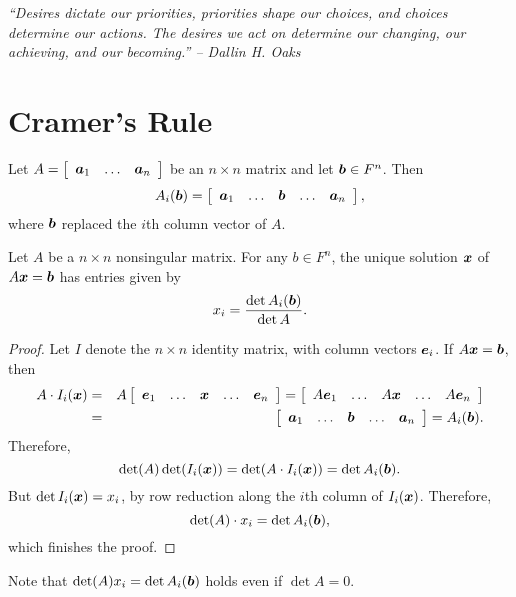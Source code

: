 \begin{center} 
\emph{``Desires dictate our priorities, priorities shape our choices, and choices determine our actions. The desires we act on determine our changing, our achieving, and our becoming.'' -- Dallin H. Oaks}
\end{center}

\section{Cramer's Rule}\label{sec:cramer}
\begin{Def} Let $A = \mtx{ccc}{\bb a_1 & \ldots & \bb a_n}$ be an $n\times n$ matrix and let $\bb b \in F^n$. Then 
\[A_i(\bb b) = \mtx{ccccc}{\bb a_1 & \ldots & \bb b & \ldots & \bb a_n},\] where $\bb b$ replaced the $i$th column vector of $A$.
\end{Def}\vs

\begin{Thm} Let $A$ be a $n\times n$ nonsingular matrix. For any $b\in F^n$, the unique solution $\bb x$ of $A\bb x = \bb b$ has entries given by 
\[x_i = \dfrac{\det A_i(\bb b)}{\det A}.\]
\end{Thm}
\begin{proof}
Let $I$ denote the $n\times n$ identity matrix, with column vectors $\bb e_i$. If $A\bb x = \bb b$, then 
\begin{eqnarray*}
A\cdot I_i(\bb x) &=& A\mtx{ccccc}{\bb e_1 & \ldots & \bb x & \ldots & \bb e_n} =  \mtx{ccccc}{A\bb e_1 & \ldots & A\bb x & \ldots & A\bb e_n}\\
&=& \mtx{ccccc}{\bb a_1 & \ldots & \bb b & \ldots & \bb a_n} = A_i(\bb b).
\end{eqnarray*} Therefore, 
\[\det(A)\det(I_i(\bb x)) = \det(A\cdot I_i(\bb x)) = \det A_i(\bb b).\] But $\det I_i(\bb x) = x_i$, by row reduction along the $i$th column of $I_i(\bb x)$. Therefore, \[\det(A)\cdot x_i = \det A_i(\bb b),\] which finishes the proof.
\end{proof}\vs

Note that $ \det(A)x_i = \det A_i(\bb b)$ holds even if $\det A = 0$.\\

